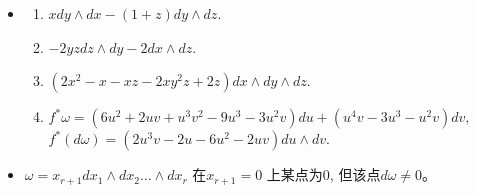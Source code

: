\begin{itemize}
\begin{enumerate}
        已知：
        $$d(\varphi \wedge \psi) = (d\varphi)\wedge \psi + (-1)^r\varphi \wedge (d\psi),$$
        $$i(X)(\varphi \wedge \psi) = (i(X)\varphi)\wedge \psi + (-1)^r\varphi \wedge (i(X)\psi),$$

        \begin{align*}
        (i(X) \circ d)(\varphi \wedge \psi) &= (i(X))((d\varphi)\wedge \psi + (-1)^r\varphi \wedge (d\psi))\\
        &= [(i(X) \circ d)\varphi]\wedge \psi + (-1)^r(d\varphi)\wedge(i(X)\psi)+ (-1)^r(i(X)\varphi)\wedge d\psi + \varphi \wedge[(i(X) \circ d)\psi]
        \end{align*}

        \begin{align*}
        (d \circ i(X))(\varphi \wedge \psi) &= d \circ ((i(X)\varphi)\wedge \psi + (-1)^r\varphi \wedge (i(X)\psi))\\
        &= [(d \circ i(X))\varphi]\wedge \psi + (-1)^r(i(X)\varphi)\wedge d\psi+ (-1)^r(d\varphi)\wedge (i(X)(\psi)) + \varphi \wedge[(d \circ i(X))\psi]
        \end{align*}

        \begin{align*}
          & \mathscr{L}_X(\varphi \wedge \psi)\\
         =& [(i(X) \circ d)\varphi]\wedge \psi + \varphi \wedge[(i(X) \circ d)\psi] + [(d \circ i(X))\varphi]\wedge \psi + \varphi \wedge[(d \circ i(X))\psi]\\
         =& \mathscr{L}_X(\varphi)\wedge \psi + \varphi \wedge \mathscr{L}_X(\psi)
        \end{align*}
    \end{enumerate}

\item[5.] 
    \begin{enumerate}
        \item[(1)] $xdy\wedge dx-(1+z)dy\wedge dz.$
        \item[(2)] $-2yzdz\wedge dy-2dx\wedge dz.$
        \item[(3)] $(2x^2-x-xz-2xy^2z+2z)dx\wedge dy \wedge dz.$
        \item[(4)] $f^*\omega = (6u^2+2uv+u^3v^2-9u^3-3u^2v)du+(u^4v-3u^3-u^2v)dv,$
        \\
        $f^*(d \omega) =(2u^3v-2u-6u^2-2uv)du\wedge dv$. 
    \end{enumerate}


\item[6.] 
    $\omega = x_{r+1}dx_1\wedge dx_2\dots \wedge dx_r$
    在$x_{r+1}=0$ 上某点为$0$, 但该点$d\omega \neq 0$。


\end{itemize}

